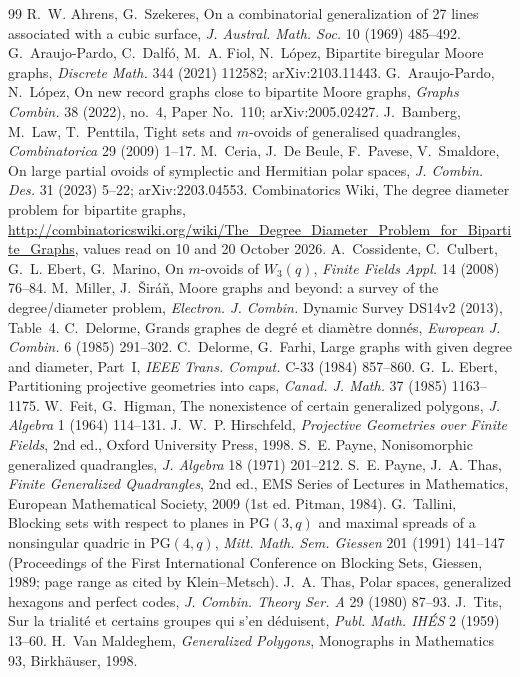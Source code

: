 \documentclass[11pt]{amsart}
\theoremstyle{definition}
\theoremstyle{remark}
\newcommand{\PG}{\mathrm{PG}}
\begin{document}
\begin{thebibliography}{99}
 R.~W. Ahrens, G.~Szekeres, On a combinatorial generalization of 27 lines associated with a cubic surface, \emph{J. Austral. Math. Soc.} 10 (1969) 485--492.
 G.~Araujo-Pardo, C.~Dalf\'o, M.~A. Fiol, N.~L\'opez, Bipartite biregular Moore graphs, \emph{Discrete Math.} 344 (2021) 112582; arXiv:2103.11443.
 G.~Araujo-Pardo, N.~L\'opez, On new record graphs close to bipartite Moore graphs, \emph{Graphs Combin.} 38 (2022), no.~4, Paper No.~110; arXiv:2005.02427.
 J.~Bamberg, M.~Law, T.~Penttila, Tight sets and $m$-ovoids of generalised quadrangles, \emph{Combinatorica} 29 (2009) 1--17.
 M.~Ceria, J.~De Beule, F.~Pavese, V.~Smaldore, On large partial ovoids of symplectic and Hermitian polar spaces, \emph{J. Combin. Des.} 31 (2023) 5--22; arXiv:2203.04553.
 Combinatorics Wiki, The degree diameter problem for bipartite graphs, \url{http://combinatoricswiki.org/wiki/The_Degree_Diameter_Problem_for_Bipartite_Graphs}, values read on 10 and 20 October 2026.
 A.~Cossidente, C.~Culbert, G.~L. Ebert, G.~Marino, On $m$-ovoids of $W_3(q)$, \emph{Finite Fields Appl.} 14 (2008) 76--84.
 M.~Miller, J.~\v{S}ir\'a\v{n}, Moore graphs and beyond: a survey of the degree/diameter problem, \emph{Electron. J. Combin.} Dynamic Survey DS14v2 (2013), Table~4.
 C.~Delorme, Grands graphes de degr\'e et diam\`etre donn\'es, \emph{European J. Combin.} 6 (1985) 291--302.
 C.~Delorme, G.~Farhi, Large graphs with given degree and diameter, Part~I, \emph{IEEE Trans. Comput.} C-33 (1984) 857--860.
 G.~L. Ebert, Partitioning projective geometries into caps, \emph{Canad. J. Math.} 37 (1985) 1163--1175.
 W.~Feit, G.~Higman, The nonexistence of certain generalized polygons, \emph{J. Algebra} 1 (1964) 114--131.
 J.~W.~P. Hirschfeld, \emph{Projective Geometries over Finite Fields}, 2nd ed., Oxford University Press, 1998.
 S.~E. Payne, Nonisomorphic generalized quadrangles, \emph{J. Algebra} 18 (1971) 201--212.
 S.~E. Payne, J.~A. Thas, \emph{Finite Generalized Quadrangles}, 2nd ed., EMS Series of Lectures in Mathematics, European Mathematical Society, 2009 (1st ed. Pitman, 1984).
 G.~Tallini, Blocking sets with respect to planes in $\PG(3,q)$ and maximal spreads of a nonsingular quadric in $\PG(4,q)$, \emph{Mitt. Math. Sem. Giessen} 201 (1991) 141--147 (Proceedings of the First International Conference on Blocking Sets, Giessen, 1989; page range as cited by Klein--Metsch).
 J.~A. Thas, Polar spaces, generalized hexagons and perfect codes, \emph{J. Combin. Theory Ser. A} 29 (1980) 87--93.
 J.~Tits, Sur la trialit\'e et certains groupes qui s'en d\'eduisent, \emph{Publ. Math. IH\'ES} 2 (1959) 13--60.
 H.~Van Maldeghem, \emph{Generalized Polygons}, Monographs in Mathematics 93, Birkh\"auser, 1998.
\end{thebibliography}
\end{document}
